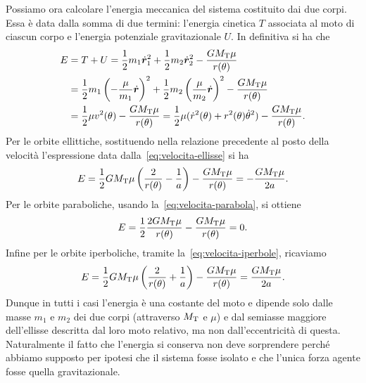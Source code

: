 {Possiamo ora calcolare l'energia meccanica del sistema costituito dai due
corpi. Essa è data dalla somma di due termini: l'energia cinetica $T$ associata
al moto di ciascun corpo e l'energia potenziale gravitazionale $U$. In
definitiva si ha che
\begin{equation}
  \label{eq:energia}
  \begin{split}
    E &= T + U = \frac{1}{2}m_1\dot{\bm{r}}_1^2 + \frac{1}{2}m_2\dot{\bm{r}}_2^2
    - \frac{GM_\textup{T}\mu}{r(\theta)} \\
    &= \frac{1}{2}m_1
    \left(
      -\frac{\mu}{m_1}\dot{\bm{r}}
    \right)^2 + \frac{1}{2}m_2
    \left(
      \frac{\mu}{m_2}\dot{\bm{r}}
    \right)^2 - \frac{GM_\textup{T}\mu}{r(\theta)} \\
    &= \frac{1}{2}\mu v^2(\theta)
    - \frac{GM_\textup{T}\mu}{r(\theta)} = \frac{1}{2}\mu(\dot{r}^2(\theta) +
    r^2(\theta)\dot{\theta}^2) - \frac{GM_\textup{T}\mu}{r(\theta)}.
  \end{split}
\end{equation}
Per le orbite ellittiche, sostituendo nella relazione precedente al posto della
velocità l'espressione data dalla~\eqref{eq:velocita-ellisse} si ha
\begin{equation}
  \label{eq:energia-ellisse}
  E = \frac{1}{2}GM_\textup{T}\mu
  \left(
    \frac{2}{r(\theta)} - \frac{1}{a}
  \right) - \frac{GM_\textup{T}\mu}{r(\theta)} = -\frac{GM_\textup{T}\mu}{2a}.
\end{equation}
Per le orbite paraboliche, usando la~\eqref{eq:velocita-parabola}, si ottiene
\begin{equation}
  E = \frac{1}{2}\frac{2GM_\textup{T}\mu}{r(\theta)} -
  \frac{GM_\textup{T}\mu}{r(\theta)} = 0.
\end{equation}
Infine per le orbite iperboliche, tramite la~\eqref{eq:velocita-iperbole},
ricaviamo
\begin{equation}
    \label{eq:energia-iperbole}
  E = \frac{1}{2}GM_\textup{T}\mu
  \left(
    \frac{2}{r(\theta)} + \frac{1}{a}
  \right) - \frac{GM_\textup{T}\mu}{r(\theta)} = \frac{GM_\textup{T}\mu}{2a}.
\end{equation}
Dunque in tutti i casi l'energia è una costante del moto e dipende solo dalle
masse $m_1$ e $m_2$ dei due corpi (attraverso $M_\textup{T}$ e $\mu$) e dal
semiasse maggiore dell'ellisse descritta dal loro moto relativo, ma non
dall'eccentricità di questa. Naturalmente il fatto che l'energia si conserva non
deve sorprendere perché abbiamo supposto per ipotesi che il sistema fosse
isolato e che l'unica forza agente fosse quella gravitazionale.

}

